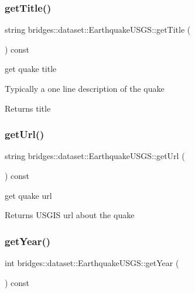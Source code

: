 \subsubsection{\texorpdfstring{get\+Title()}{getTitle()}}
{\footnotesize\ttfamily string bridges\+::dataset\+::\+Earthquake\+U\+S\+G\+S\+::get\+Title (\begin{DoxyParamCaption}{ }\end{DoxyParamCaption}) const\hspace{0.3cm}{\ttfamily [inline]}}



get quake title 

Typically a one line description of the quake

\begin{DoxyReturn}{Returns}
title 
\end{DoxyReturn}
\mbox{\label{classbridges_1_1dataset_1_1_earthquake_u_s_g_s_ab009982ed697df7ea2c913eb2b7e88be}} 
\subsubsection{\texorpdfstring{get\+Url()}{getUrl()}}
{\footnotesize\ttfamily string bridges\+::dataset\+::\+Earthquake\+U\+S\+G\+S\+::get\+Url (\begin{DoxyParamCaption}{ }\end{DoxyParamCaption}) const\hspace{0.3cm}{\ttfamily [inline]}}



get quake url 

\begin{DoxyReturn}{Returns}
U\+S\+G\+IS url about the quake 
\end{DoxyReturn}
\mbox{\label{classbridges_1_1dataset_1_1_earthquake_u_s_g_s_a569120c9051d8d2fd73e3c778a81b9f3}} 
\subsubsection{\texorpdfstring{get\+Year()}{getYear()}}
{\footnotesize\ttfamily int bridges\+::dataset\+::\+Earthquake\+U\+S\+G\+S\+::get\+Year (\begin{DoxyParamCaption}{ }\end{DoxyParamCaption}) const\hspace{0.3cm}{\ttfamily [inline]}}



